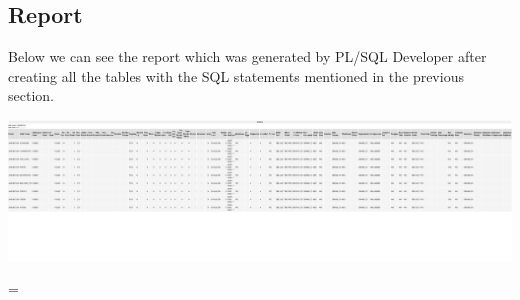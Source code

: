 \subsection{Report}

Below we can see the report which was generated by PL/SQL Developer after creating all the tables with the SQL statements mentioned in the previous section.

\newlength{\classpagewidth}
\setlength{\classpagewidth}{\pdfpagewidth}
\eject
\pdfpagewidth=115cm
\thispagestyle{empty}
\includegraphics[page=1]{images/report.pdf}

\eject
\pdfpagewidth=\classpagewidth